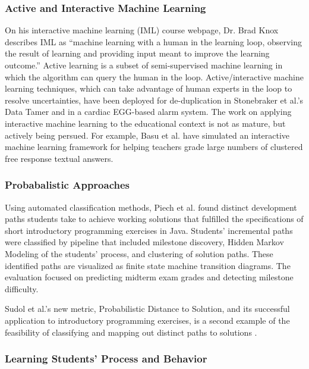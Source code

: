 \documentclass[12pt]{article}
\begin{document}
\subsubsection{Active and Interactive Machine Learning}

On his interactive machine learning (IML) course webpage, Dr. Brad Knox describes IML as ``machine learning with a human in the learning loop, observing the result of learning and providing input meant to improve the learning outcome.'' Active learning is a subset of semi-supervised machine learning in which the algorithm can query the human in the loop. Active/interactive machine learning techniques, which can take advantage of human experts in the loop to resolve uncertainties, have been deployed for de-duplication in Stonebraker et al.'s Data Tamer \cite{stonebraker2013data} and in a cardiac EGG-based alarm system\cite{JWiensNIPS}. The work on applying interactive machine learning to the educational context is not as mature, but actively being persued. For example, Basu et al. \cite{basupowergrading} have simulated an interactive machine learning framework for helping teachers grade large numbers of clustered free response textual answers.


\subsubsection{Probabalistic Approaches}

Using automated classification methods, Piech et al. \cite{Piech} found distinct development paths students take to achieve working solutions that fulfilled the specifications of short introductory programming exercises in Java. Students' incremental paths were classified by pipeline that included milestone discovery, Hidden Markov Modeling of the students' process, and clustering of solution paths. These identified paths are visualized as finite state machine transition diagrams. The evaluation focused on predicting midterm exam grades and detecting milestone difficulty. 

Sudol et al.'s new metric, Probabilistic Distance to Solution, and its successful application to introductory programming exercises, is a second example of the feasibility of classifying and mapping out distinct paths to solutions \cite{sudol12}. %

\subsubsection{Learning Students' Process and Behavior}
\end{document}

